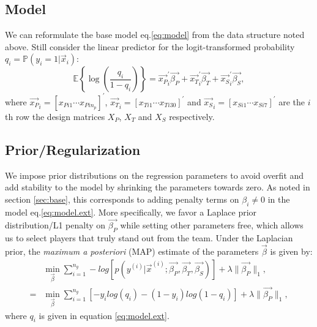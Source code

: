 \subsection{Model}
We can reformulate the base model eq.\eqref{eq:model} from the data structure noted above. Still consider the linear predictor for the logit-transformed probability $q_i=\mathbb{P}(y_i=1|\vec{x}_i)$: 
\begin{equation}
\mathbb{E}\left\{\log \left(\frac{q_i}{1-q_i} \right)\right\} 
= \vec{x_P}^\prime_i \vec{\beta_P} + \vec{x_T}^\prime_i \vec{\beta_T} + \vec{x_S}^\prime_i\vec{\beta_S} ,
\label{eq:model.ext}
\end{equation}
where $\vec{x_P}_i = [x_{Pi1} \cdots x_{Pin_p}]^\prime$,  $\vec{x_T}_i = [x_{Ti1} \cdots x_{Ti30}]^\prime$ and $\vec{x_S}_i = [x_{Si1} \cdots x_{Si7}]^\prime$ are the $i$th row the design matrices $X_P$, $X_T$ and $X_S$ respectively. 

\subsection{Prior/Regularization} %
We impose prior distributions on the regression parameters to avoid overfit and add stability to the model by shrinking the parameters towards zero. As noted in section \ref{sec:base}, this corresponds to adding penalty terms on $\beta_i \neq 0$ in the model eq.\eqref{eq:model.ext}. More specifically, we favor a Laplace prior distribution/L1 penalty on $\vec{\beta_P}$ while setting other parameters free, which allows us to select players that truly stand out from the team. Under the Laplacian prior, the {\em maximum a posteriori} (MAP) estimate of the parameters $\vec{\beta}$ is given by:
\begin{equation}
\begin{aligned}
&\min_\vec{\beta} \sum_{i=1}^{n_g} -log [p(y^{(i)}|\vec{x}^{(i)};\vec{\beta_P},\vec{\beta_T},\vec{\beta_S})]+\lambda   \|\vec{\beta_P}\|_1,\\
= &\min_\vec{\beta}  \sum_{i=1}^{n_g} [-y_ilog(q_i)-(1-y_i)log(1-q_i)] + \lambda   \|\vec{\beta_P}\|_1,
\label{eq:modelwithL2}
\end{aligned}
\end{equation}
where $q_i$ is given in equation \eqref{eq:model.ext}. 

